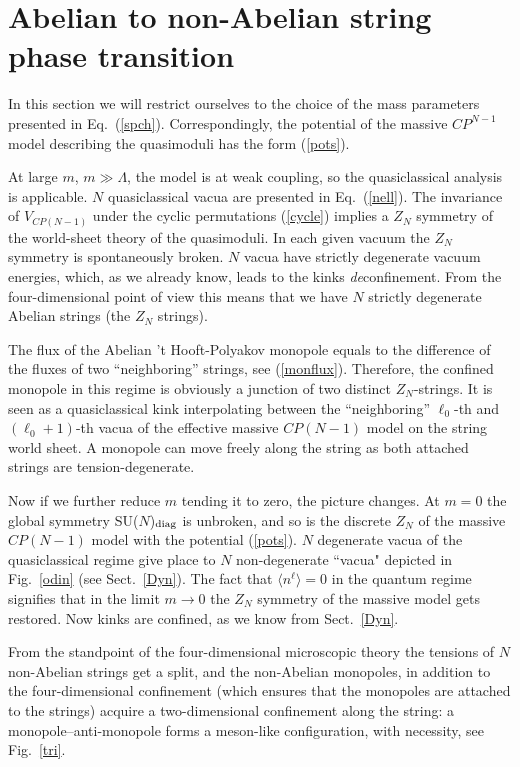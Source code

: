 \section{Abelian to non-Abelian string phase transition}
\label{atna}

In this section we will restrict ourselves to the choice of the mass parameters
presented in Eq.~(\ref{spch}). Correspondingly, the
potential of the massive $CP^{N-1}$ model 
describing the  quasimoduli has the form (\ref{pots}).

At large $m$, $m\gg\Lambda$,  the model is at weak coupling, so the 
quasiclassical analysis is applicable.
$N$ quasiclassical vacua are presented in Eq.~(\ref{nell}).
The invariance of $V_{CP(N-1)}$ under the cyclic permutations
(\ref{cycle}) implies a $Z_N$ symmetry of the world-sheet theory of the quasimoduli. 
In each given vacuum
the $Z_N$ symmetry is spontaneously
broken. $N$ vacua have strictly degenerate vacuum energies, which, as 
we already know, leads to the 
kinks   {\em de}confinement. From the four-dimensional point of view this
means that we have $N$ strictly degenerate Abelian strings (the $Z_N$ strings).

The flux of the Abelian 't Hooft-Polyakov monopole 
equals to the difference of the fluxes of two ``neighboring'' strings,
see (\ref{monflux}).  Therefore, the confined monopole
in this regime is obviously  a junction of two distinct
$Z_N$-strings. It is seen as a quasiclassical kink
interpolating between the ``neighboring'' $\ell_0$-th and $(\ell_0 +1)$-th
vacua  of the 
effective massive $CP(N-1)$ model on the string world sheet. 
A  monopole can move freely along the string as both 
attached strings are tension-degenerate.

Now if we further reduce $m$ tending  it to zero, the picture changes. 
At $m=0$ the global symmetry
SU($N$)$_{\rm diag}$ is unbroken, and so is the 
discrete $Z_N$ of the massive 
$CP(N-1)$ model with the potential (\ref{pots}).
$N$ degenerate vacua of the quasiclassical regime 
give place to $N$ non-degenerate ``vacua" depicted in Fig.~\ref{odin}
(see Sect.~\ref{Dyn}). The fact that $\langle n^\ell\rangle =0$
in the quantum regime signifies that in the limit $m\to 0$
the $Z_N$ symmetry of the massive model gets restored.
Now kinks are confined, as we know from  Sect.~\ref{Dyn}. 

{}From the standpoint of the four-dimensional 
microscopic theory the tensions of $N$ 
non-Abelian strings get a split, and the non-Abelian monopoles, 
in addition to  the four-dimensional confinement 
(which ensures that the monopoles
are attached to the strings) acquire a two-dimensional confinement along 
the string:
a monopole--anti-monopole   forms a meson-like configuration, with necessity, 
see Fig.~\ref{tri}.

